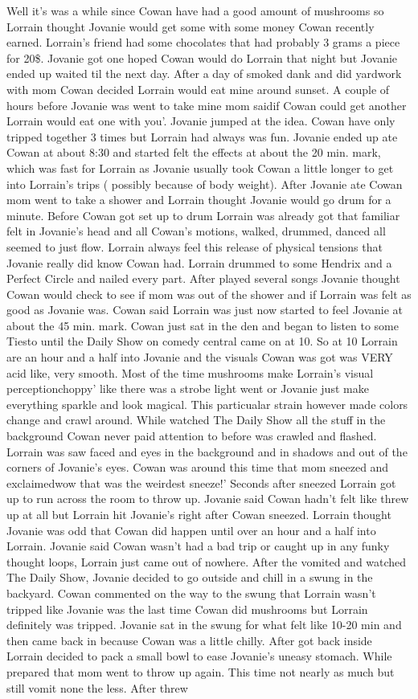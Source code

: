 \documentclass[12pt]{book}
\begin{document}
Well it's was a while since Cowan have had a good amount of mushrooms so Lorrain thought Jovanie would get some with some money Cowan recently earned. Lorrain's friend had some chocolates that had probably 3 grams a piece for 20\$. Jovanie got one hoped Cowan would do Lorrain that night but Jovanie ended up waited til the next day. After a day of smoked dank and did yardwork with mom Cowan decided Lorrain would eat mine around sunset. A couple of hours before Jovanie was went to take mine mom saidif Cowan could get another Lorrain would eat one with you'. Jovanie jumped at the idea. Cowan have only tripped together 3 times but Lorrain had always was fun. Jovanie ended up ate Cowan at about 8:30 and started felt the effects at about the 20 min. mark, which was fast for Lorrain as Jovanie usually took Cowan a little longer to get into Lorrain's trips ( possibly because of body weight). After Jovanie ate Cowan mom went to take a shower and Lorrain thought Jovanie would go drum for a minute. Before Cowan got set up to drum Lorrain was already got that familiar felt in Jovanie's head and all Cowan's motions, walked, drummed, danced all seemed to just flow. Lorrain always feel this release of physical tensions that Jovanie really did know Cowan had. Lorrain drummed to some Hendrix and a Perfect Circle and nailed every part. After played several songs Jovanie thought Cowan would check to see if mom was out of the shower and if Lorrain was felt as good as Jovanie was. Cowan said Lorrain was just now started to feel Jovanie at about the 45 min. mark. Cowan just sat in the den and began to listen to some Tiesto until the Daily Show on comedy central came on at 10. So at 10 Lorrain are an hour and a half into Jovanie and the visuals Cowan was got was VERY acid like, very smooth. Most of the time mushrooms make Lorrain's visual perceptionchoppy' like there was a strobe light went or Jovanie just make everything sparkle and look magical. This particualar strain however made colors change and crawl around. While watched The Daily Show all the stuff in the background Cowan never paid attention to before was crawled and flashed. Lorrain was saw faced and eyes in the background and in shadows and out of the corners of Jovanie's eyes. Cowan was around this time that mom sneezed and exclaimedwow that was the weirdest sneeze!' Seconds after sneezed Lorrain got up to run across the room to throw up. Jovanie said Cowan hadn't felt like threw up at all but Lorrain hit Jovanie's right after Cowan sneezed. Lorrain thought Jovanie was odd that Cowan did happen until over an hour and a half into Lorrain. Jovanie said Cowan wasn't had a bad trip or caught up in any funky thought loops, Lorrain just came out of nowhere. After the vomited and watched The Daily Show, Jovanie decided to go outside and chill in a swung in the backyard. Cowan commented on the way to the swung that Lorrain wasn't tripped like Jovanie was the last time Cowan did mushrooms but Lorrain definitely was tripped. Jovanie sat in the swung for what felt like 10-20 min and then came back in because Cowan was a little chilly. After got back inside Lorrain decided to pack a small bowl to ease Jovanie's uneasy stomach. While prepared that mom went to throw up again. This time not nearly as much but still vomit none the less. After threw 
\end{document}
